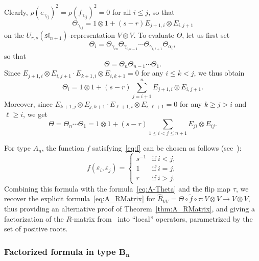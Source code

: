 \documentclass[10pt,a4paper]{amsart}
\numberwithin{equation}{section}
\newcommand{\ssl}{\mathfrak{sl}}
\begin{document}
Clearly, $\rho(e_{\gamma_{ij}})^{2} = \rho(f_{\gamma_{ij}})^{2} = 0$ for all $i \le j$, so that
\begin{displaymath}
 \Theta_{\gamma_{ij}} = 1 \otimes 1 + (s - r)E_{j + 1,i} \otimes E_{i,j + 1}
\end{displaymath}
on the $U_{r,s}(\ssl_{n+1})$-representation $V \otimes V$. To evaluate $\Theta$, let us first set
\begin{displaymath}
 \Theta_{i} = \Theta_{\gamma_{in}}\Theta_{\gamma_{i,n-1}}\cdots \Theta_{\gamma_{i,i+1}}\Theta_{\alpha_{i}},
\end{displaymath}
so that
\begin{displaymath}
 \Theta = \Theta_{n}\Theta_{n-1}\cdots \Theta_{1}.
\end{displaymath}
Since $E_{j + 1,i} \otimes E_{i,j + 1} \cdot E_{k + 1,i} \otimes E_{i,k + 1} = 0$ for any $i\leq k < j$, we thus obtain
\begin{displaymath}
 \Theta_{i} = 1 \otimes 1 + (s - r)\sum_{j = i + 1}^{n} E_{j + 1,i} \otimes E_{i,j + 1}.
\end{displaymath}
Moreover, since $E_{k + 1,j} \otimes E_{j,k + 1} \cdot E_{\ell + 1,i} \otimes E_{i,\ell + 1} = 0$ for any $k \geq j > i$ and $\ell \geq i$, we get
\begin{equation}\label{eq:A-Theta}
 \Theta = \Theta_{n}\cdots \Theta_{1} = 1 \otimes 1 + (s - r)\sum_{1 \le i < j \le n + 1} E_{ji} \otimes E_{ij}.
\end{equation}

For type $A_{n}$, the function $f$ satisfying~\eqref{eq:f} can be chosen as follows (see~\cite[Lemma~4.4]{BW1}):
\begin{displaymath}
 f(\varepsilon_{i},\varepsilon_{j}) =
 \begin{cases}
 s^{-1} & \text{if}\ i < j, \\
 1 & \text{if}\ i = j, \\
 r & \text{if}\ i > j.
 \end{cases}
\end{displaymath}
Combining this formula with the formula~\eqref{eq:A-Theta} and the flip map $\tau$, we recover the explicit formula~\eqref{eq:A_RMatrix} for $\hat{R}_{VV}=\Theta \circ \widetilde{f} \circ \tau\colon V \otimes V \to V \otimes V$, thus providing an alternative proof of Theorem~\ref{thm:A_RMatrix}, and giving a factorization of the $R$-matrix from~\cite{BW2} into ``local'' operators, parametrized by the set of positive roots.

\subsubsection[Factorized formula in type B\_n]{Factorized formula in type $\boldsymbol{B_{n}}$}
\end{document}
